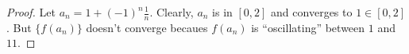 \documentclass{article}
\begin{document}
\begin{enumerate}
\begin{proof}
    Let $a_n = 1 + (-1)^n \frac{1}{n}$. Clearly, $a_n$ is in
    $[0,2]$ and converges to $1 \in [0,2]$. But $\{f(a_n)\}$
    doesn't converge becaues $f(a_n)$ is  ``oscillating'' between $1$ and $11$. 

  \end{proof}
\end{enumerate}
\end{document}
